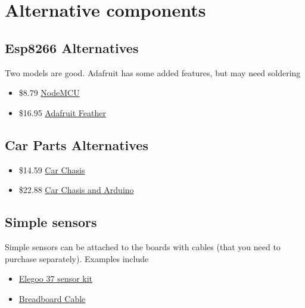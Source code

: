 \section{Alternative components}\label{alternative-components}

\subsection{Esp8266 Alternatives}\label{esp8266-alternatives}

Two models are good. Adafruit has some added features, but may need
soldering

\begin{itemize}
\tightlist
\item
  \$8.79
  \href{https://www.amazon.com/HiLetgo-Version-NodeMCU-Internet-Development/dp/B010O1G1ES/ref=sr_1_3?s=electronics\&ie=UTF8\&qid=1499251149\&sr=1-3\&keywords=esp8266}{NodeMCU}
\item
  \$16.95 \href{https://www.adafruit.com/product/2821}{Adafruit Feather}
\end{itemize}

\subsection{Car Parts Alternatives}\label{car-parts-alternatives}

\begin{itemize}
\tightlist
\item
  \$14.59
  \href{https://www.amazon.com/Ardokit-Chassis-Encoder-Battery-Arduino/dp/B00K5OWHXO/ref=sr_1_3?s=electronics\&ie=UTF8\&qid=1499251712\&sr=1-3\&keywords=robot+car}{Car
  Chasis}
\item
  \$22.88
  \href{https://www.amazon.com/VKmaker-Avoidance-tracking-Chassis-Ultrasonic/dp/B01CXVA6IO/ref=sr_1_6?s=electronics\&ie=UTF8\&qid=1499251770\&sr=1-6\&keywords=robot+car}{Car
  Chasis and Arduino}
\end{itemize}

\subsection{Simple sensors}\label{simple-sensors}

Simple sensors can be attached to the boards with cables (that you need
to purchase separately). Examples include

\begin{itemize}
\tightlist
\item
  \href{https://www.amazon.com/Elegoo-Sensor-Module-Arduino-MEGA/dp/B009OVGKTQ/ref=sr_1_5?s=electronics\&ie=UTF8\&qid=1500678010\&sr=1-5\&keywords=grove+sensor}{Elegoo
  37 sensor kit}
\item
  \href{https://www.amazon.com/Breadboard-Wires-Aoyoho-Multicolored-Jumper/dp/B01GK2Q4ZQ/ref=sr_1_1?s=electronics\&ie=UTF8\&qid=1500678142\&sr=1-1\&keywords=bread+board+cab\%3Be}{Breadboard
  Cable}
\end{itemize}

